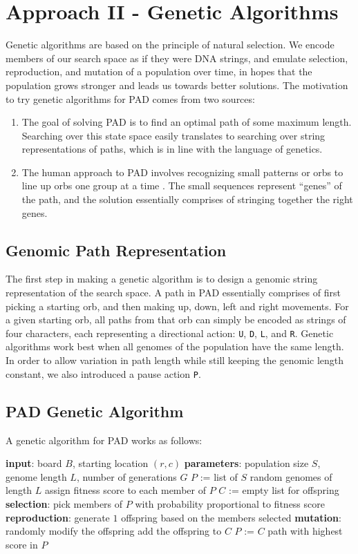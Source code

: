 \documentclass[journal,final,letterpaper,11pt]{IEEEtran}
\begin{document}
\section{Approach II - Genetic Algorithms}
Genetic algorithms are based on the principle of natural selection. We encode members of our search space as if they were DNA strings, and emulate selection, reproduction, and mutation of a population over time, in hopes that the population grows stronger and leads us towards better solutions. The motivation to try genetic algorithms for PAD comes from two sources: 
\begin{enumerate}
\item The goal of solving PAD is to find an optimal path of some maximum length. Searching over this state space easily translates to searching over string representations of paths, which is in line with the language of genetics.
\item The human approach to PAD involves recognizing small patterns or orbs to line up orbs one group at a time \cite{5}. The small sequences represent ``genes'' of the path, and the solution essentially comprises of stringing together the right genes. 
\end{enumerate}

\subsection{Genomic Path Representation}
The first step in making a genetic algorithm is to design a genomic string representation of the search space. A path in PAD essentially comprises of first picking a starting orb, and then making up, down, left and right movements. For a given starting orb, all paths from that orb can simply be encoded as strings of four characters, each representing a directional action: \texttt{U}, \texttt{D}, \texttt{L}, and \texttt{R}. Genetic algorithms work best when all genomes of the population have the same length. In order to allow variation in path length while still keeping the genomic length constant, we also introduced a pause action \texttt{P}. 

\subsection{PAD Genetic Algorithm}
A genetic algorithm for PAD works as follows:
\begin{algorithmic}[1]
\STATE \textbf{input}: board $B$, starting location $(r, c)$
\STATE \textbf{parameters}: population size $S$, genome length $L$, number of generations $G$
\STATE $P$ := list of $S$ random genomes of length $L$
  \STATE assign fitness score to each member of $P$
  \STATE $C$ := empty list for offspring
    \STATE \textbf{selection}: pick members of $P$ with probability proportional to fitness score
    \STATE \textbf{reproduction}: generate $1$ offspring based on the members selected
    \STATE \textbf{mutation}: randomly modify the offspring
    \STATE add the offspring to $C$
  \ENDFOR
  \STATE $P$ := $C$
\ENDFOR
\RETURN path with highest score in $P$
\end{algorithmic}
\end{document}
